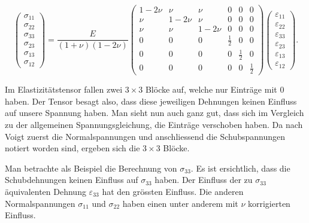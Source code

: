 \begin{equation}
\begin{pmatrix}
	\sigma_{11}\\
	\sigma_{22}\\
	\sigma_{33}\\
	\sigma_{23}\\
	\sigma_{13}\\
	\sigma_{12}
\end{pmatrix}
=
\frac{E}{(1+\nu)(1-2\nu)}
\begin{pmatrix}
	1- 2\nu & \nu     & \nu     & 0           & 0           & 0\\
	    \nu & 1- 2\nu & \nu     & 0           & 0           & 0\\
        \nu & \nu     & 1- 2\nu & 0           & 0           & 0\\
          0 & 0       & 0       & \frac{1}{2} & 0           & 0\\
          0 & 0       & 0       & 0           & \frac{1}{2} & 0\\
          0 & 0       & 0       & 0           & 0           & \frac{1}{2}
\end{pmatrix}
\begin{pmatrix}
	\varepsilon_{11}\\
	\varepsilon_{22}\\
	\varepsilon_{33}\\
	\varepsilon_{23}\\
	\varepsilon_{13}\\
	\varepsilon_{12}
\end{pmatrix}
.
\label{spannung:Spannungsgleichung}
\end{equation}

Im Elastizitätstensor fallen zwei $3\times3$ Blöcke auf, welche nur Einträge mit $0$ haben. Der Tensor besagt also,
dass diese jeweiligen Dehnungen keinen Einfluss auf unsere Spannung haben.
Man sieht nun auch ganz gut, dass sich im Vergleich zu der allgemeinen Spannungsgleichung, die Einträge verschoben haben.
Da nach Voigt zuerst die Normalspannungen und anschliessend die Schubspannungen notiert worden sind, ergeben sich die  $3\times3$ Blöcke.

Man betrachte als Beispiel die Berechnung von $\sigma_{33}$.
Es ist ersichtlich, dass die Schubdehnungen keinen Einfluss auf $\sigma_{33}$ haben.
Der Einfluss der zu $\sigma_{33}$ äquivalenten Dehnung $\varepsilon_{33}$ hat den grössten Einfluss.
Die anderen Normalspannungen $\sigma_{11}$ und $\sigma_{22}$ haben einen unter anderem mit $\nu$ korrigierten Einfluss.

